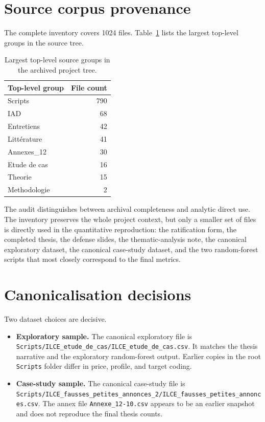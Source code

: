 \documentclass[11pt,a4paper]{article}
\begin{document}
\section{Source corpus provenance}
The complete inventory covers 1024 files. Table~\ref{tab:groups} lists the largest top-level groups in the source tree.

\begin{table}[H]
\centering
\caption{Largest top-level source groups in the archived project tree.}
\label{tab:groups}
\begin{tabular}{lr}
\toprule
Top-level group & File count \\
\midrule
Scripts & 790 \\
IAD & 68 \\
Entretiens & 42 \\
Littérature & 41 \\
Annexes\_12 & 30 \\
Etude de cas & 16 \\
Theorie & 15 \\
Methodologie & 2 \\
\bottomrule
\end{tabular}
\end{table}

The audit distinguishes between archival completeness and analytic direct use. The inventory preserves the whole project context, but only a smaller set of files is directly used in the quantitative reproduction: the ratification form, the completed thesis, the defense slides, the thematic-analysis note, the canonical exploratory dataset, the canonical case-study dataset, and the two random-forest scripts that most closely correspond to the final metrics.

\section{Canonicalisation decisions}
Two dataset choices are decisive.
\begin{itemize}[leftmargin=1.5em]
    \item \textbf{Exploratory sample.} The canonical exploratory file is \texttt{Scripts/ILCE\_etude\_de\_cas/ILCE\_etude\_de\_cas.csv}. It matches the thesis narrative and the exploratory random-forest output. Earlier copies in the root \texttt{Scripts} folder differ in price, profile, and target coding.
    \item \textbf{Case-study sample.} The canonical case-study file is \texttt{Scripts/ILCE\_fausses\_petites\_annonces\_2/ILCE\_fausses\_petites\_annonces.csv}. The annex file \texttt{Annexe\_12-10.csv} appears to be an earlier snapshot and does not reproduce the final thesis counts.
\end{itemize}
\end{document}
